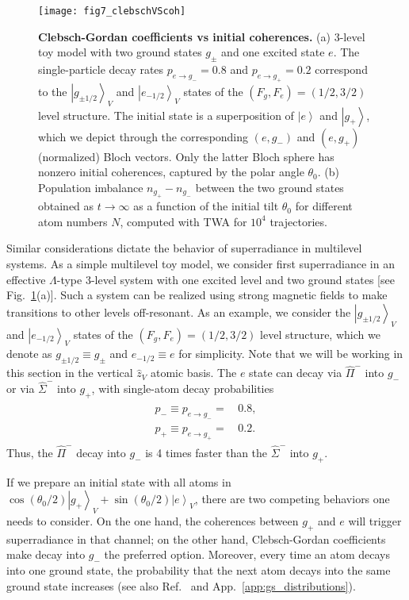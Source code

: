 \documentclass[aps,prx,superscriptaddress,twocolumn,notitlepage,nofootinbib,longbibliography]{revtex4-2}
\newcommand{\ket}[1]{\left|#1\right>}
\newcommand{\quv}{\hat{z}}
\begin{document}
\begin{figure}[tb]
\centering
\texttt{[image: fig7\_clebschVScoh]}
\caption{\textbf{Clebsch-Gordan coefficients vs initial coherences.} (a) 3-level toy model with two ground states $g_{\pm}$ and one excited state $e$. The single-particle decay rates $p_{e\rightarrow g_-}=0.8$ and $p_{e\rightarrow g_+}=0.2$ correspond to the $\ket{g_{\pm1/2}}_V$ and $\ket{e_{-1/2}}_V$ states of the $(F_g,F_e)=(1/2,3/2)$ level structure. The initial state is a superposition of $\ket{e}$ and $\ket{g_+}$, which we depict through the corresponding $(e,g_-)$ and $(e,g_+)$ (normalized) Bloch vectors. Only the latter Bloch sphere has nonzero initial coherences, captured by the polar angle $\theta_0$. (b) Population imbalance $n_{g_+}-n_{g_-}$ between the two ground states obtained as $t\rightarrow\infty$ as a function of the initial tilt $\theta_0$ for different atom numbers $N$, computed with TWA for $10^4$ trajectories.}
\label{fig:clebschVScoh}
\end{figure}

Similar considerations dictate the behavior of superradiance in multilevel systems. As a simple multilevel toy model, 
we consider first superradiance in an effective $\Lambda$-type 3-level system with one excited level and two ground states [see Fig.~\ref{fig:clebschVScoh}(a)].
Such a system can be realized using strong magnetic fields to make transitions to other levels off-resonant.
As an example, we consider the $\ket{g_{\pm1/2}}_V$ and $\ket{e_{-1/2}}_V$ states of the $(F_g,F_e)=(1/2,3/2)$ level structure, which we denote as $g_{\pm 1/2} \equiv g_{\pm}$ and $e_{-1/2} \equiv e$ for simplicity. Note that we will be working in this section in the vertical $\quv_V$ atomic basis. The $e$ state can decay via $\hat{\Pi}^-$ into $g_-$ or via $\hat{\Sigma}^-$ into $g_+$, with single-atom decay probabilities
\begin{align}
\begin{aligned}
	p_- \equiv p_{e \rightarrow g_-} =&\, 0.8, \\
	p_+ \equiv p_{e \rightarrow g_+} =&\, 0.2 .
\end{aligned}
\label{eq:decays_6l_1/23/2}
\end{align}
Thus, the $\hat{\Pi}^-$ decay into $g_-$ is 4 times faster than the $\hat{\Sigma}^-$ into $g_+$.

If we  prepare  an initial state with all atoms in $\cos(\theta_0/2)\ket{g_+}_V+\sin(\theta_0/2)\ket{e}_V$, there are two competing behaviors one needs to consider.  
On the one hand, the coherences between $g_+$ and $e$ will trigger superradiance in that channel; on the other hand, Clebsch-Gordan coefficients make decay into $g_-$ the preferred option.
Moreover, every time an atom decays into one ground state, the probability that the next atom decays into the same ground state increases (see also Ref.~\cite{AsenjoMasson_PRL2020} and App.~\ref{app:gs_distributions}).
\end{document}
